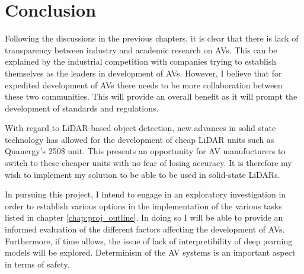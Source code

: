\let\textcircled=\pgftextcircled


\chapter{Conclusion}
\label{chap:conclusion}

Following the discussions in the previous chapters, it is clear that there is lack of transparency between industry and academic research on AVs. This can be explained by the industrial competition with companies trying to establish themselves as the leaders in development of AVs. However, I believe that for expedited development of AVs there needs to be more collaboration between these two communities. This will provide an overall benefit as it will prompt the development of standards and regulations. 

With regard to LiDAR-based object detection, new advances in solid state technology has allowed for the development of cheap LiDAR units such as Quanergy's 250\$ unit.  This presents an opportunity for AV manufucturers to switch to these cheaper units with no fear of losing accuracy. 
It is therefore my wish to implement my solution to be able to be used in solid-state LiDARs.

In pursuing this project, I intend to engage in an exploratory investigation in order to establish various options in the implementation of the various tasks listed in chapter \ref{chap:proj_outline}. In doing so I will be able to provide an informed evaluation of the different factors affecting the development of AVs.  Furthermore, if time allows, the issue of lack of interpretibility of deep ;earning models will be explored. Determinism of the AV systems is an important aspect in terms of safety. 

